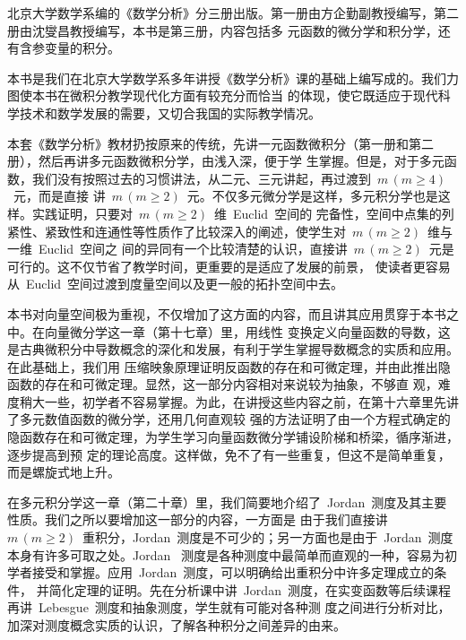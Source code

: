 
\begin{preface}
北京大学数学系编的《数学分析》分三册出版。第一册由方企勤副教授编写，第二册由沈燮昌教授编写，本书是第三册，内容包括多
元函数的微分学和积分学，还有含参变量的积分。

本书是我们在北京大学数学系多年讲授《数学分析》课的基础上编写成的。我们力图使本书在微积分教学现代化方面有较充分而恰当
的体现，使它既适应于现代科学技术和数学发展的需要，又切合我国的实际教学情况。

本套《数学分析》教材扔按原来的传统，先讲一元函数微积分（第一册和第二册），然后再讲多元函数微积分学，由浅入深，便于学
生掌握。但是，对于多元函数，我们没有按照过去的习惯讲法，从二元、三元讲起，再过渡到~$m\,(m\geq 4)$~元，而是直接
讲~$m\,(m\geq 2)$~元。不仅多元微分学是这样，多元积分学也是这样。实践证明，只要对~$m\,(m\geq 2)$~维~Euclid~空间的
完备性，空间中点集的列紧性、紧致性和连通性等性质作了比较深入的阐述，使学生对~$m\,(m\geq 2)$~维与一维~Euclid~空间之
间的异同有一个比较清楚的认识，直接讲~$m\,(m\geq 2)$~元是可行的。这不仅节省了教学时间，更重要的是适应了发展的前景，%
使读者更容易从~Euclid~空间过渡到度量空间以及更一般的拓扑空间中去。

本书对向量空间极为重视，不仅增加了这方面的内容，而且讲其应用贯穿于本书之中。在向量微分学这一章（第十七章）里，用线性
变换定义向量函数的导数，这是古典微积分中导数概念的深化和发展，有利于学生掌握导数概念的实质和应用。在此基础上，我们用
压缩映象原理证明反函数的存在和可微定理，并由此推出隐函数的存在和可微定理。显然，这一部分内容相对来说较为抽象，不够直
观，难度稍大一些，初学者不容易掌握。为此，在讲授这些内容之前，在第十六章里先讲了多元数值函数的微分学，还用几何直观较
强的方法证明了由一个方程式确定的隐函数存在和可微定理，为学生学习向量函数微分学铺设阶梯和桥梁，循序渐进，逐步提高到预
定的理论高度。这样做，免不了有一些重复，但这不是简单重复，而是螺旋式地上升。

在多元积分学这一章（第二十章）里，我们简要地介绍了~Jordan~测度及其主要性质。我们之所以要增加这一部分的内容，一方面是
由于我们直接讲~$m\,(m\geq 2)$~重积分，Jordan~测度是不可少的；另一方面也是由于~Jordan~测度本身有许多可取之处。Jordan~
测度是各种测度中最简单而直观的一种，容易为初学者接受和掌握。应用~Jordan~测度，可以明确给出重积分中许多定理成立的条件，%
并简化定理的证明。先在分析课中讲~Jordan~测度，在实变函数等后续课程再讲~Lebesgue~测度和抽象测度，学生就有可能对各种测
度之间进行分析对比，加深对测度概念实质的认识，了解各种积分之间差异的由来。


\end{preface}
